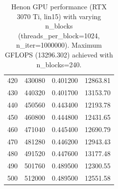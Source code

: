 \begin{table}[H]
\begin{tabular}{|r|r|r|r|}
        420          & 430080          & 0.401200          & 12863.81          \\
        430          & 440320          & 0.401700          & 13153.70          \\
        440          & 450560          & 0.443400          & 12193.78          \\
        450          & 460800          & 0.444800          & 12431.65          \\
        460          & 471040          & 0.445400          & 12690.79          \\
        470          & 481280          & 0.446200          & 12943.43          \\
        480          & 491520          & 0.447600          & 13177.48          \\
        490          & 501760          & 0.489500          & 12300.55          \\
        500          & 512000          & 0.489500          & 12551.58          \\
        \hline
    \end{tabular}
    \caption{Henon GPU performance (RTX 3070 Ti, lin15) with varying n\_blocks (threads\_per\_block=1024, n\_iter=1000000). Maximum GFLOPS (13296.302) achieved with n\_blocks=240.}
    \label{tab:henon_nblocks}
\end{table}


